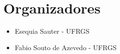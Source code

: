 
\chapter*{Organizadores}

\begin{itemize}
\item[] Esequia Sauter - UFRGS
\item[] Fabio Souto de Azevedo - UFRGS
\end{itemize}